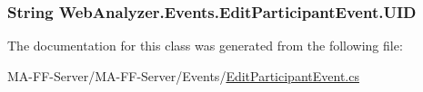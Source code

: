 \subsubsection[{U\+I\+D}]{\setlength{\rightskip}{0pt plus 5cm}String Web\+Analyzer.\+Events.\+Edit\+Participant\+Event.\+U\+I\+D\hspace{0.3cm}{\ttfamily [get]}}\label{class_web_analyzer_1_1_events_1_1_edit_participant_event_acef746eb86f5262d48b583822b20cfcc}


The documentation for this class was generated from the following file\+:\begin{DoxyCompactItemize}
\item 
M\+A-\/\+F\+F-\/\+Server/\+M\+A-\/\+F\+F-\/\+Server/\+Events/\hyperlink{_edit_participant_event_8cs}{Edit\+Participant\+Event.\+cs}\end{DoxyCompactItemize}
